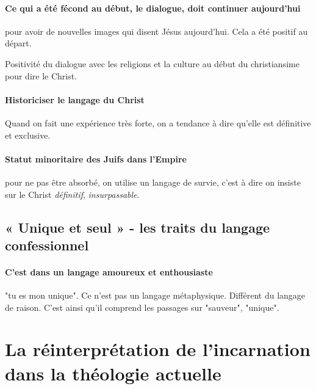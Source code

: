 \paragraph{Ce qui a été fécond au début, le dialogue, doit continuer aujourd'hui} pour avoir de nouvelles images qui disent Jésus aujourd'hui. Cela a été positif au départ. 

\begin{Synthesis}
Positivité du dialogue avec les religions et la culture au début du christiansime pour dire le Christ.
\end{Synthesis}

\paragraph{Historiciser le langage du Christ} Quand on fait une expérience très forte, on a tendance à dire qu'elle est définitive et exclusive. 

\paragraph{Statut minoritaire des Juifs dans l'Empire} pour ne pas être absorbé, on utilise un langage de survie, c'est à dire on insiste sur le Christ \textit{définitif}, \textit{insurpassable}.


 
\subsection{« Unique et seul » - les traits du langage confessionnel}


 \paragraph{C'est dans un langage amoureux et enthousiaste} "tu es mon unique". Ce n'est pas un langage métaphysique.   Différent du langage de raison. C'est ainsi qu'il comprend les passages sur "sauveur", "unique".

 

\section{La réinterprétation de l’incarnation dans la théologie actuelle}
 

